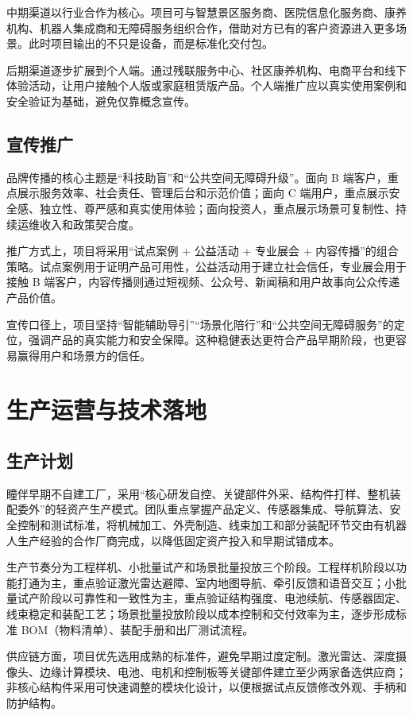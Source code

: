 \documentclass[a4paper,fontset=none]{ctexart}
\begin{document}
中期渠道以行业合作为核心。项目可与智慧景区服务商、医院信息化服务商、康养机构、机器人集成商和无障碍服务组织合作，借助对方已有的客户资源进入更多场景。此时项目输出的不只是设备，而是标准化交付包。

后期渠道逐步扩展到个人端。通过残联服务中心、社区康养机构、电商平台和线下体验活动，让用户接触个人版或家庭租赁版产品。个人端推广应以真实使用案例和安全验证为基础，避免仅靠概念宣传。

\subsection{宣传推广}

品牌传播的核心主题是“科技助盲”和“公共空间无障碍升级”。面向 B 端客户，重点展示服务效率、社会责任、管理后台和示范价值；面向 C 端用户，重点展示安全感、独立性、尊严感和真实使用体验；面向投资人，重点展示场景可复制性、持续运维收入和政策契合度。

推广方式上，项目将采用“试点案例 + 公益活动 + 专业展会 + 内容传播”的组合策略。试点案例用于证明产品可用性，公益活动用于建立社会信任，专业展会用于接触 B 端客户，内容传播则通过短视频、公众号、新闻稿和用户故事向公众传递产品价值。

宣传口径上，项目坚持“智能辅助导引”“场景化陪行”和“公共空间无障碍服务”的定位，强调产品的真实能力和安全保障。这种稳健表达更符合产品早期阶段，也更容易赢得用户和场景方的信任。

\section{生产运营与技术落地}

\subsection{生产计划}

瞳伴早期不自建工厂，采用“核心研发自控、关键部件外采、结构件打样、整机装配委外”的轻资产生产模式。团队重点掌握产品定义、传感器集成、导航算法、安全控制和测试标准，将机械加工、外壳制造、线束加工和部分装配环节交由有机器人生产经验的合作厂商完成，以降低固定资产投入和早期试错成本。

生产节奏分为工程样机、小批量试产和场景批量投放三个阶段。工程样机阶段以功能打通为主，重点验证激光雷达避障、室内地图导航、牵引反馈和语音交互；小批量试产阶段以可靠性和一致性为主，重点验证结构强度、电池续航、传感器固定、线束稳定和装配工艺；场景批量投放阶段以成本控制和交付效率为主，逐步形成标准 BOM（物料清单）、装配手册和出厂测试流程。

供应链方面，项目优先选用成熟的标准件，避免早期过度定制。激光雷达、深度摄像头、边缘计算模块、电池、电机和控制板等关键部件建立至少两家备选供应商；非核心结构件采用可快速调整的模块化设计，以便根据试点反馈修改外观、手柄和防护结构。
\end{document}
